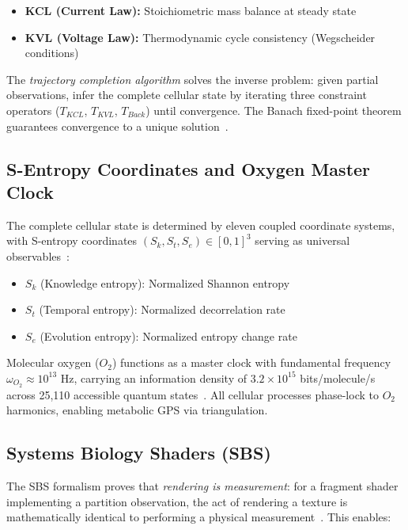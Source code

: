 \documentclass[12pt,a4paper]{article}
\begin{document}
\begin{itemize}
    \item \textbf{KCL (Current Law):} Stoichiometric mass balance at steady state
    \item \textbf{KVL (Voltage Law):} Thermodynamic cycle consistency (Wegscheider conditions)
\end{itemize}

The \textit{trajectory completion algorithm} solves the inverse problem: given partial observations, infer the complete cellular state by iterating three constraint operators ($T_{KCL}$, $T_{KVL}$, $T_{Back}$) until convergence. The Banach fixed-point theorem guarantees convergence to a unique solution~\cite{sachikonye2026cellular}.

\subsection{S-Entropy Coordinates and Oxygen Master Clock}

The complete cellular state is determined by eleven coupled coordinate systems, with S-entropy coordinates $(S_k, S_t, S_e) \in [0,1]^3$ serving as universal observables~\cite{sachikonye2026cellular}:

\begin{itemize}
    \item $S_k$ (Knowledge entropy): Normalized Shannon entropy
    \item $S_t$ (Temporal entropy): Normalized decorrelation rate
    \item $S_e$ (Evolution entropy): Normalized entropy change rate
\end{itemize}

Molecular oxygen ($O_2$) functions as a master clock with fundamental frequency $\omega_{O_2} \approx 10^{13}$ Hz, carrying an information density of $3.2 \times 10^{15}$ bits/molecule/s across 25,110 accessible quantum states~\cite{sachikonye2026equations}. All cellular processes phase-lock to $O_2$ harmonics, enabling metabolic GPS via triangulation.

\subsection{Systems Biology Shaders (SBS)}

The SBS formalism proves that \textit{rendering is measurement}: for a fragment shader implementing a partition observation, the act of rendering a texture is mathematically identical to performing a physical measurement~\cite{sachikonye2026sbs}. This enables:
\end{document}
